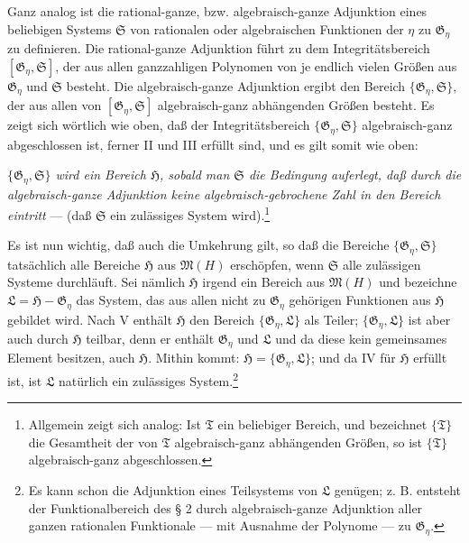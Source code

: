 \documentclass[11pt]{article}
\begin{document}
Ganz analog ist die rational-ganze, bzw. algebraisch-ganze Adjunktion eines
beliebigen Systems $\mathfrak S$ von rationalen oder algebraischen Funktionen der
$\eta$ zu $\mathfrak G_\eta$ zu definieren. Die rational-ganze Adjunktion führt
zu dem Integritätsbereich $[\mathfrak G_\eta,\mathfrak S]$, der aus allen
ganzzahligen Polynomen von je endlich vielen Größen aus $\mathfrak G_\eta$ und
$\mathfrak S$ besteht. Die algebraisch-ganze Adjunktion ergibt den Bereich
$\{\mathfrak G_\eta,\mathfrak S\}$, der aus allen von
$[\mathfrak G_\eta,\mathfrak S]$ algebraisch-ganz abhängenden Größen besteht.
Es zeigt sich wörtlich wie oben, daß der Integritätsbereich
$\{\mathfrak G_\eta,\mathfrak S\}$ algebraisch-ganz abgeschlossen ist, ferner II
und III erfüllt sind, und es gilt somit wie oben:

\emph{$\{\mathfrak G_\eta,\mathfrak S\}$ wird ein Bereich $\mathfrak H$, sobald
man $\mathfrak S$ die Bedingung auferlegt, daß durch die algebraisch-ganze
Adjunktion keine algebraisch-gebrochene Zahl in den Bereich eintritt} --- (daß
$\mathfrak S$ ein zulässiges System wird).\footnote{Allgemein zeigt sich analog:
Ist $\mathfrak T$ ein beliebiger Bereich, und bezeichnet $\{\mathfrak T\}$ die
Gesamtheit der von $\mathfrak T$ algebraisch-ganz abhängenden Größen, so ist
$\{\mathfrak T\}$ algebraisch-ganz abgeschlossen.}

Es ist nun wichtig, daß auch die Umkehrung gilt, so daß die Bereiche
$\{\mathfrak G_\eta,\mathfrak S\}$ tatsächlich alle Bereiche $\mathfrak H$ aus
$\mathfrak M(H)$ erschöpfen, wenn $\mathfrak S$ alle zulässigen Systeme
durchläuft. Sei nämlich $\mathfrak H$ irgend ein Bereich aus $\mathfrak M(H)$
und bezeichne $\mathfrak L=\mathfrak H-\mathfrak G_\eta$ das System, das aus
allen nicht zu $\mathfrak G_\eta$ gehörigen Funktionen aus $\mathfrak H$ gebildet
wird. Nach V enthält $\mathfrak H$ den Bereich $\{\mathfrak G_\eta,\mathfrak L\}$
als Teiler; $\{\mathfrak G_\eta,\mathfrak L\}$ ist aber auch durch $\mathfrak H$
teilbar, denn er enthält $\mathfrak G_\eta$ und $\mathfrak L$ und da diese kein
gemeinsames Element besitzen, auch $\mathfrak H$. Mithin kommt:
$\mathfrak H=\{\mathfrak G_\eta,\mathfrak L\}$; und da IV für $\mathfrak H$
erfüllt ist, ist $\mathfrak L$ natürlich ein zulässiges System.\footnote{Es kann
schon die Adjunktion eines Teilsystems von $\mathfrak L$ genügen; z. B. entsteht
der Funktionalbereich des § 2 durch algebraisch-ganze Adjunktion aller ganzen
rationalen Funktionale --- mit Ausnahme der Polynome --- zu $\mathfrak G_\eta$.}
\end{document}
